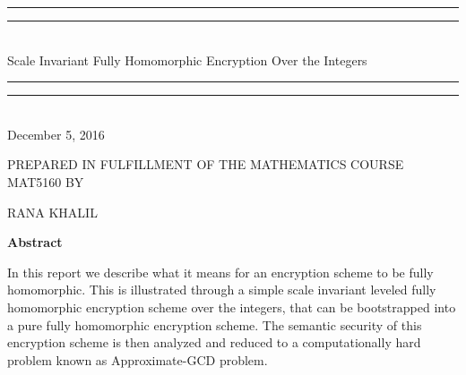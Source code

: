\documentclass[../../main.tex]{subfiles}
\begin{document}
{\begingroup %
\centering %
\vspace*{\baselineskip} %

\rule{\textwidth}{1.6pt}\vspace*{-\baselineskip}\vspace*{2pt} %
\rule{\textwidth}{0.4pt}\\[\baselineskip] %

{\LARGE Scale Invariant Fully Homomorphic Encryption Over the Integers}%

\rule{\textwidth}{0.4pt}\vspace*{-\baselineskip}\vspace{3.2pt} %
\rule{\textwidth}{1.6pt}\\[\baselineskip] %

December 5, 2016\par %
\bigskip
\bigskip
\vspace*{2\baselineskip} %


\bigskip
\bigskip
\bigskip
PREPARED IN FULFILLMENT OF THE MATHEMATICS COURSE MAT5160 BY  \\[\baselineskip]
{\Large RANA KHALIL\par} %
\bigskip
\bigskip

\begin{comment}
    
{\itshape SUPERVISED BY\par} %
\bigskip
{\Large CARLISLE ADAMS \& DANIEL FIORILLI\par} %

\vfill %

\end{comment}

\vfill %

\textbf{Abstract\\}

In this report we describe what it means for an encryption scheme to be fully homomorphic. This is illustrated through a simple scale invariant leveled fully homomorphic encryption scheme over the integers, that can be bootstrapped into a pure fully homomorphic encryption scheme. The semantic security of this encryption scheme is then analyzed and reduced to a computationally hard problem known as Approximate-GCD problem.
\endgroup}
\end{document}
